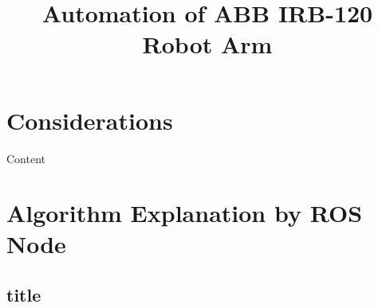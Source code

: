 \documentclass[11pt]{article}
\title{Automation of ABB IRB-120 Robot Arm}
\begin{document}
\maketitle

\section{Considerations}
Content

\section{Algorithm Explanation by ROS Node}
\subsection{title}
\end{document}
